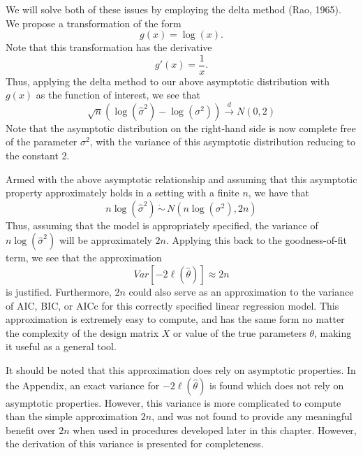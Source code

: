 		We will solve both of these issues by employing the delta method (Rao, 1965). We propose a transformation of the form
		\begin{equation}
			g(x) = \log(x) .
		\end{equation}
		Note that this transformation has the derivative
		\begin{equation}
			g'(x) = \frac{1}{x} .
		\end{equation}
		Thus, applying the delta method to our above asymptotic distribution with $g(x)$ as the function of interest, we see that
		\begin{equation}
			\sqrt{n} ( \log (\hat{\sigma}^2) - \log(\sigma^2)) \xrightarrow[]{d} N(0, 2)
		\end{equation}
		Note that the asymptotic distribution on the right-hand side is now complete free of the parameter $\sigma^2$, with the variance of this asymptotic distribution reducing
		to the constant 2.

		Armed with the above asymptotic relationship and assuming that this asymptotic property approximately holds in a setting with a finite $n$, we have that
		\begin{equation}
			n\log(\hat{\sigma}^2) \, \dot\sim \, N \left( n\log(\sigma^2), 2n \right)
		\end{equation}
		Thus, assuming that the model is appropriately specified, the variance of $n\log(\hat{\sigma}^2)$ will be approximately $2n$. Applying this back to the goodness-of-fit term,
		we see that the approximation
		\begin{equation}
			Var \left[ -2 \ell (\hat{\theta}  ) \right] \approx 2n
		\end{equation}
		is justified. Furthermore, $2n$ could also serve as an approximation to the variance of AIC, BIC, or AICc for this correctly specified linear regression model. This approximation
		is extremely easy to compute, and has the same form no matter the complexity of the design matrix $X$ or value of the true parameters $\theta$, making it useful as a
		general tool.

		It should be noted that this approximation does rely on asymptotic properties. In the Appendix, an exact variance for $-2 \ell (\hat{\theta})$ is found which does
		not rely on asymptotic properties. However, this variance is more complicated to compute than the simple approximation $2n$, and was not found to provide any meaningful
		benefit over $2n$ when used in procedures developed later in this chapter. However, the derivation of this variance is presented for completeness.
		
